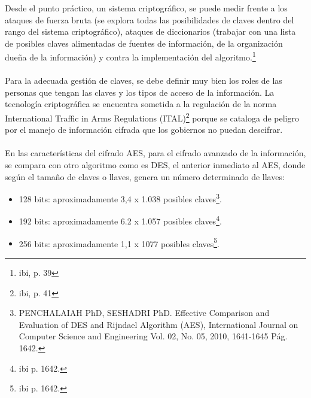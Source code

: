 \documentclass[a4paper,openright,12pt]{book}
\theoremstyle{definition}
\theoremstyle{remark}
\begin{document}
Desde el punto práctico, un sistema criptográfico, se puede medir frente a los ataques de fuerza bruta (se explora todas las posibilidades de claves dentro del rango del sistema criptográfico),  ataques de diccionarios (trabajar con una lista de posibles claves alimentadas de fuentes de información, de la organización dueña de la información) y contra la implementación del algoritmo.\footnote{ibi, p. 39}\\\\
Para la adecuada gestión de claves, se debe definir muy bien los roles de las personas que tengan las claves y los tipos de acceso de la información. La tecnología criptográfica se encuentra sometida a la regulación de la norma International Traffic in Arms Regulations (ITAL)\footnote{ibi, p. 41} porque se cataloga de peligro por el manejo de información cifrada que los gobiernos no puedan descifrar.\\\\
En las características del cifrado AES, para el cifrado avanzado de la información, se compara con otro algoritmo como es DES, el anterior inmediato al AES, donde según el tamaño de claves o llaves, genera un número determinado de llaves:
\begin{itemize}
	\item 128 bits: aproximadamente 3,4 x 1.038 posibles claves\footnote{PENCHALAIAH PhD, SESHADRI  PhD. Effective Comparison and Evaluation of DES and Rijndael Algorithm (AES), International Journal on Computer Science and Engineering Vol. 02, No. 05, 2010, 1641-1645 Pág. 1642.}.
    \item 192 bits: aproximadamente 6.2 x 1.057 posibles claves\footnote{ibi p. 1642.}.
    \item 256 bits: aproximadamente 1,1 x 1077 posibles claves\footnote{ibi p. 1642.}.
\end{itemize}
\end{document}
